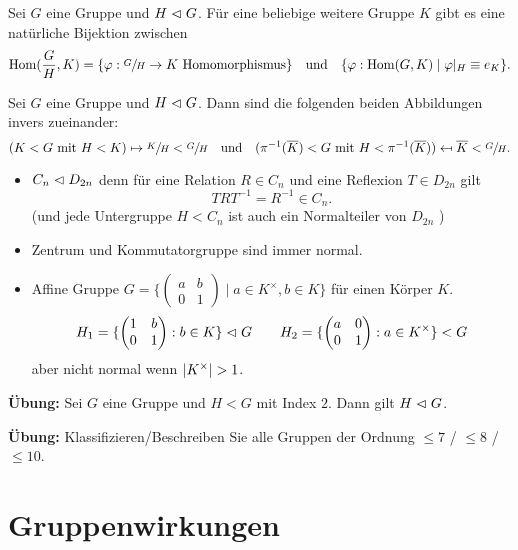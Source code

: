 \begin{corollary}
	Sei $G$ eine Gruppe und $H \vartriangleleft G$.
	Für eine beliebige weitere Gruppe $K$ gibt es eine natürliche Bijektion zwischen 
	\[
		\hom(\frac{G}{H},K) = \{ \varphi: \sfrac{G}{H} \to K \text{ Homomorphismus}\} \qq{und} \{\varphi: \hom(G,K) \mid \varphi \vert_{H} \equiv e_{K}\} 
	.\] 
\end{corollary}

\begin{corollary}
	Sei $G$ eine Gruppe und $H \vartriangleleft G$.
	Dann sind die folgenden beiden Abbildungen invers zueinander:
	\[
		(K < G \text{ mit } H < K) \mapsto  \sfrac{K}{H} < \sfrac{G}{H} \qq{und}(\pi^{-1}(\overline{K}) < G \text{ mit } H < \pi^{-1}(\overline{K})) \mapsfrom \overline{K} < \sfrac{G}{H}
	.\] 
\end{corollary}

\begin{eg}
	\begin{itemize}
		\item $C_{n} \vartriangleleft D_{2n}$ denn für eine Relation $R \in C_{n}$ und eine Reflexion $T \in D_{2n}$ gilt
			\[
			T R T^{-1} = R^{-1} \in C_{n}
			.\]
			(und jede Untergruppe $H < C_{n}$ ist auch ein Normalteiler von $D_{2n}$ )
		\item Zentrum und Kommutatorgruppe sind immer normal.
		\item Affine Gruppe $G = \{\begin{pmatrix} 
					a &b \\ 0 & 1
		\end{pmatrix} \mid a \in K^{\times}, b \in K\} $ für einen Körper $K$.
		\[
		H_1 = \{\begin{pmatrix} 
				1 &b\\ 0 &1
		\end{pmatrix} : b \in K\} \vartriangleleft G \qquad H_2 = \{ \begin{pmatrix} 
				a &0\\ 0 &1
		\end{pmatrix} : a \in K^{\times}\} < G
		\]
		aber nicht normal wenn $\abs{K^{\times}} > 1$.
	\end{itemize}
\end{eg}

\textbf{Übung:}
Sei $G$ eine Gruppe und $H < G$ mit Index $2$.
Dann gilt $H \vartriangleleft G$.

\textbf{Übung:} Klassifizieren/Beschreiben Sie alle Gruppen der Ordnung $\leq 7$ / $\leq 8$ / $\leq 10$.

\section{Gruppenwirkungen}

